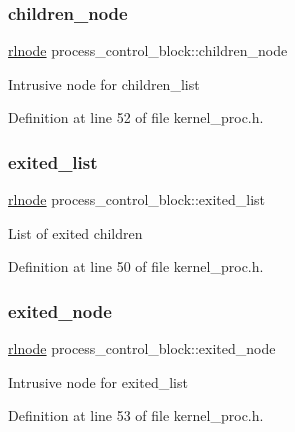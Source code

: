 \subsubsection{\texorpdfstring{children\+\_\+node}{children\_node}}
{\footnotesize\ttfamily \hyperlink{group__rlists_ga8f6244877f7ce2322c90525217ea6e7a}{rlnode} process\+\_\+control\+\_\+block\+::children\+\_\+node}

Intrusive node for {\ttfamily children\+\_\+list} 

Definition at line 52 of file kernel\+\_\+proc.\+h.

\mbox{\label{structprocess__control__block_afddb936103b136214462e1ed870c4c70}} 
\subsubsection{\texorpdfstring{exited\+\_\+list}{exited\_list}}
{\footnotesize\ttfamily \hyperlink{group__rlists_ga8f6244877f7ce2322c90525217ea6e7a}{rlnode} process\+\_\+control\+\_\+block\+::exited\+\_\+list}

List of exited children 

Definition at line 50 of file kernel\+\_\+proc.\+h.

\mbox{\label{structprocess__control__block_a9e0d93783a89bd92f39243353f04a27e}} 
\subsubsection{\texorpdfstring{exited\+\_\+node}{exited\_node}}
{\footnotesize\ttfamily \hyperlink{group__rlists_ga8f6244877f7ce2322c90525217ea6e7a}{rlnode} process\+\_\+control\+\_\+block\+::exited\+\_\+node}

Intrusive node for {\ttfamily exited\+\_\+list} 

Definition at line 53 of file kernel\+\_\+proc.\+h.

\mbox{\label{structprocess__control__block_add9b4f6d506a3538be7b53411e94fd28}} 

